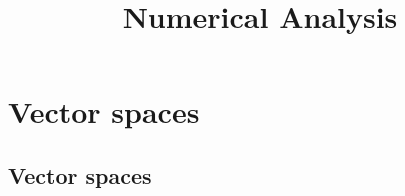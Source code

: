 \documentclass[a4paper]{article}
\begin{document}
\title{Numerical Analysis}

\maketitle

\newpage

\tableofcontents

\newpage

\section{Vector spaces}

\subsection{Vector spaces}
\end{document}
